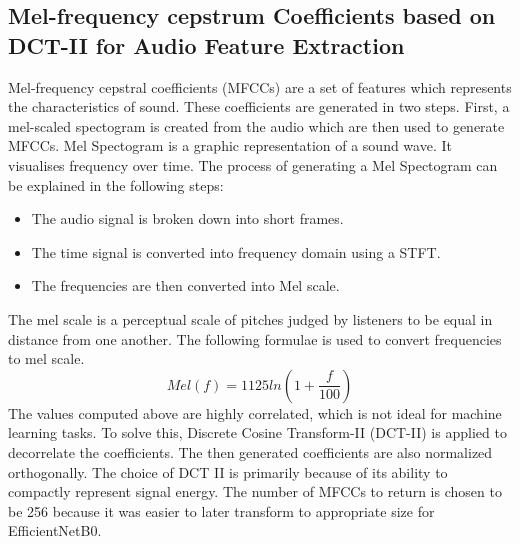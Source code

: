 \documentclass[fleqn, 10pt, twoside]{IOEGC}
\begin{document}
\subsection{Mel-frequency cepstrum Coefficients based on DCT-II for Audio Feature Extraction
}
Mel-frequency cepstral coefficients (MFCCs) are a set of features which represents the characteristics of sound. These coefficients are generated in two steps. First, a mel-scaled spectogram is created from the audio which are then used to generate MFCCs.
Mel Spectogram is a graphic representation of a sound wave. It visualises frequency over time. The process of generating a Mel Spectogram can be explained in the following steps:
\begin{itemize}
	\item {The audio signal is broken down into short frames.}
	\item {The time signal is converted into frequency domain using a STFT.}
	      \item{The frequencies are then converted into Mel scale.}
\end{itemize}
The mel scale is a perceptual scale of pitches judged by listeners to be equal in distance from one another. The following formulae is used to convert frequencies to mel scale.
\[
	Mel(f)=1125ln(1+ \frac{f}{100})
\]
The values computed above are highly correlated, which is not ideal for machine learning tasks. To solve this, Discrete Cosine Transform-II (DCT-II) is applied to decorrelate the coefficients. The then generated coefficients are also normalized orthogonally. The choice of DCT II is primarily because of its ability to compactly represent signal energy. The number of MFCCs to return is chosen to be 256 because it was easier to later transform to appropriate size for EfficientNetB0.
\end{document}
